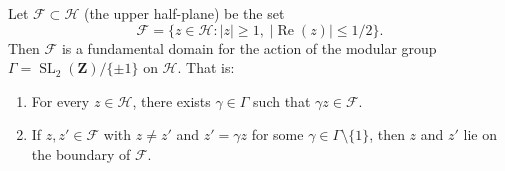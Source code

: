 Let $\mathcal{F} \subset \mathcal{H}$ (the upper half-plane) be the set
$$
\mathcal{F} = \{z \in \mathcal{H} : |z| \geq 1, \; |\operatorname{Re}(z)| \leq 1/2\}.
$$
Then $\mathcal{F}$ is a fundamental domain for the action of the modular group $\Gamma = \operatorname{SL}_2(\mathbf{Z})/\{\pm 1\}$ on $\mathcal{H}$. That is:
\begin{enumerate}
\item[(i)] For every $z \in \mathcal{H}$, there exists $\gamma \in \Gamma$ such that $\gamma z \in \mathcal{F}$.
\item[(ii)] If $z, z' \in \mathcal{F}$ with $z \neq z'$ and $z' = \gamma z$ for some $\gamma \in \Gamma \setminus \{1\}$, then $z$ and $z'$ lie on the boundary of $\mathcal{F}$.
\end{enumerate}
